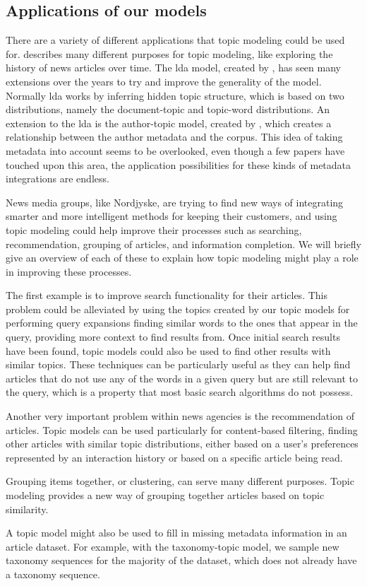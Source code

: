 \subsection{Applications of our models}\label{sec:appendix_applications}
There are a variety of different applications that topic modeling could be used for. 
\citet{Probabilistic_Topic_Models} describes many different purposes for topic modeling, like exploring the history of news articles over time.
The \gls{lda} model, created by \citet{blei2003latent}, has seen many extensions over the years to try and improve the generality of the model.
Normally \gls{lda} works by inferring hidden topic structure, which is based on two distributions, namely the document-topic and topic-word distributions.
An extension to the \gls{lda} is the author-topic model, created by \citet{author_topic_2012}, which creates a relationship between the author metadata and the corpus.
This idea of taking metadata into account seems to be overlooked, even though a few papers have touched upon this area, the application possibilities for these kinds of metadata integrations are endless.

News media groups, like Nordjyske, are trying to find new ways of integrating smarter and more intelligent methods for keeping their customers, and using topic modeling could help improve their processes such as searching, recommendation, grouping of articles, and information completion.
We will briefly give an overview of each of these to explain how topic modeling might play a role in improving these processes.

The first example is to improve search functionality for their articles.
This problem could be alleviated by using the topics created by our topic models for performing query expansions finding similar words to the ones that appear in the query, providing more context to find results from.
Once initial search results have been found, topic models could also be used to find other results with similar topics.
These techniques can be particularly useful as they can help find articles that do not use any of the words in a given query but are still relevant to the query, which is a property that most basic search algorithms do not possess.

Another very important problem within news agencies is the recommendation of articles.
Topic models can be used particularly for content-based filtering, finding other articles with similar topic distributions, either based on a user's preferences represented by an interaction history or based on a specific article being read.

Grouping items together, or clustering, can serve many different purposes. 
Topic modeling provides a new way of grouping together articles based on topic similarity.

A topic model might also be used to fill in missing metadata information in an article dataset.
For example, with the taxonomy-topic model, we sample new taxonomy sequences for the majority of the dataset, which does not already have a taxonomy sequence.